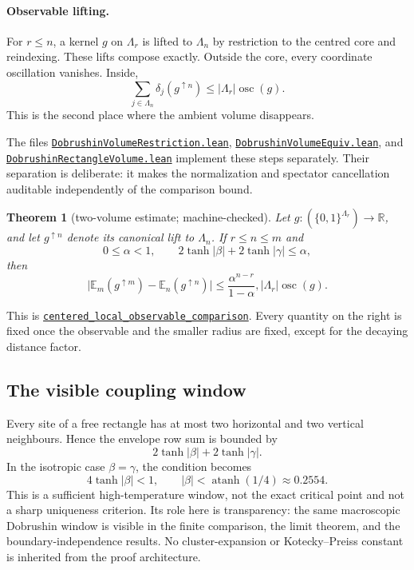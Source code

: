 \documentclass[11pt]{article}
\newtheorem{theorem}{Theorem}[section]
\theoremstyle{definition}
\newcommand{\R}{\mathbb R}
\newcommand{\E}{\mathbb E}
\newcommand{\osc}{\operatorname{osc}}
\newcommand{\abs}[1]{\lvert #1\rvert}
\newcommand{\sourceanchor}{f587b35001f4ae87c7fe0383662864df6bc9a1c0}
\newcommand{\leanfile}[2]{%
  \href{https://github.com/lluiseriksson/THE-ERIKSSON-PROGRAMME/blob/\sourceanchor/YangMills/OS/#1.lean}{\nolinkurl{#2.lean}}}
\newcommand{\leanline}[3]{%
  \href{https://github.com/lluiseriksson/THE-ERIKSSON-PROGRAMME/blob/\sourceanchor/YangMills/OS/#1.lean\#L#2}{\nolinkurl{#3}}}
\begin{document}
\paragraph{Observable lifting.}
For $r\le n$, a kernel $g$ on $\Lambda_r$ is lifted to $\Lambda_n$ by
restriction to the centred core and reindexing.  These lifts compose exactly.
Outside the core, every coordinate oscillation vanishes.  Inside,
\[
  \sum_{j\in\Lambda_n}\delta_j(g^{\uparrow n})
  \le\abs{\Lambda_r}\osc(g).
\]
This is the second place where the ambient volume disappears.

The files \leanfile{DobrushinVolumeRestriction}{DobrushinVolumeRestriction},
\leanfile{DobrushinVolumeEquiv}{DobrushinVolumeEquiv}, and
\leanfile{DobrushinRectangleVolume}{DobrushinRectangleVolume} implement these
steps separately.  Their separation is deliberate: it makes the normalization
and spectator cancellation auditable independently of the comparison bound.

\begin{theorem}[two-volume estimate; machine-checked]
\label{thm:two-volume}
Let $g:(\{0,1\}^{\Lambda_r})\to\R$, and let $g^{\uparrow n}$ denote its
canonical lift to $\Lambda_n$.  If $r\le n\le m$ and
\[
  0\le\alpha<1,
  \qquad
  2\tanh\abs\beta+2\tanh\abs\gamma\le\alpha,
\]
then
\[
  \abs{\E_m(g^{\uparrow m})-\E_n(g^{\uparrow n})}
  \le
  \frac{\alpha^{n-r}}{1-\alpha},
  \abs{\Lambda_r}\osc(g).
\]
\end{theorem}

This is
\leanline{DobrushinRectangleVolume}{278}{centered_local_observable_comparison}.
Every quantity on the right is fixed once the observable and the smaller
radius are fixed, except for the decaying distance factor.

\subsection{The visible coupling window}

Every site of a free rectangle has at most two horizontal and two vertical
neighbours.  Hence the envelope row sum is bounded by
\[
  2\tanh\abs\beta+2\tanh\abs\gamma.
\]
In the isotropic case $\beta=\gamma$, the condition becomes
\[
  4\tanh\abs\beta<1,
  \qquad
  \abs\beta<\operatorname{atanh}(1/4)\approx0.2554.
\]
This is a sufficient high-temperature window, not the exact critical point
and not a sharp uniqueness criterion.  Its role here is transparency: the
same macroscopic Dobrushin window is visible in the finite comparison, the
limit theorem, and the boundary-independence results.  No cluster-expansion or
Kotecky--Preiss constant is inherited from the proof architecture.
\end{document}

